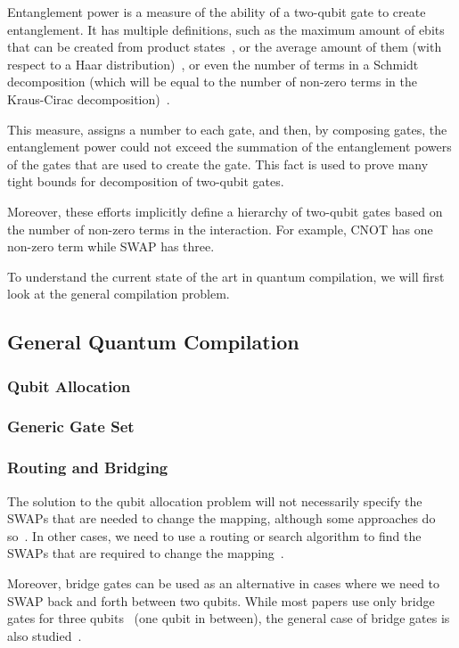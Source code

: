 \documentclass{report}
\begin{document}
Entanglement power is a measure of the ability of a two-qubit gate to create entanglement. It has multiple definitions, such as the maximum amount of ebits that can be created from product states~\cite{shen2018}, or the average amount of them (with respect to a Haar distribution)~\cite{zanardi2000}, or even the number of terms in a Schmidt decomposition (which will be equal to the number of non-zero terms in the Kraus-Cirac decomposition)~\cite{nielsen2003}.

This measure, assigns a number to each gate, and then, by composing gates, the entanglement power could not exceed the summation of the entanglement powers of the gates that are used to create the gate. This fact is used to prove many tight bounds for decomposition of two-qubit gates.

Moreover, these efforts implicitly define a hierarchy of two-qubit gates based on the number of non-zero terms in the interaction. For example, CNOT has one non-zero term while SWAP has three.

To understand the current state of the art in quantum compilation, we will first look at the general compilation problem. 

\subsection{General Quantum Compilation}


\subsubsection{Qubit Allocation}

\subsubsection{Generic Gate Set}
\subsubsection{Routing and Bridging}

The solution to the qubit allocation problem will not necessarily specify the SWAPs that are needed to change the mapping, although some approaches do so~\cite{childs, li2019, zhou2020}. In other cases, we need to use a routing or search algorithm to find the SWAPs that are required to change the mapping~\cite{zulehner2018, sivarajah2021}.

Moreover, bridge gates can be used as an alternative in cases where we need to SWAP back and forth between two qubits. While most papers use only bridge gates for three qubits~\cite{sivarajah2021,itoko2019,shende2006,siraichi2018} (one qubit in between), the general case of bridge gates is also studied~\cite{zhou2020, nash2020}.
\end{document}
